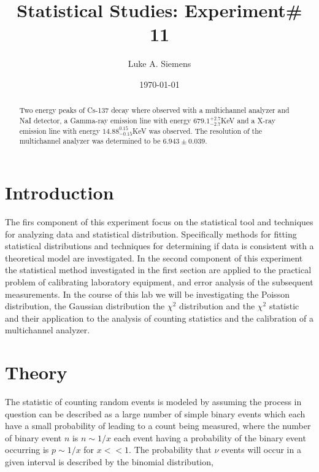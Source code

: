 \documentclass[%
 reprint,
 amsmath,amssymb,
 aps,
]{revtex4-1}
\begin{document}
\title{Statistical Studies: Experiment\# 11}%

\author{Luke A. Siemens}

\date{\today}

\begin{abstract}
Two energy peaks of Cs-137 decay where observed with a multichannel analyzer and NaI detector, a Gamma-ray emission line with energy $679.1_{-2.7}^{+2.7}$KeV and a X-ray emission line with energy $14.88_{-0.15}^{0.15}$KeV was observed. The resolution of the multichannel analyzer was determined to be $6.943\pm0.039$.
\end{abstract}

\maketitle

\section{Introduction}

The firs component of this experiment focus on the statistical tool and techniques for analyzing data and statistical distribution. Specifically methods for fitting statistical distributions and techniques for determining if data is consistent with a theoretical model are investigated. In the second component of this experiment the statistical method investigated in the first section are applied to the practical problem of calibrating laboratory equipment, and error analysis of the subsequent measurements. In the course of this lab we will be investigating the Poisson distribution, the Gaussian distribution the $\chi^2$ distribution and the $\chi^2$ statistic and their application to the analysis of counting statistics and the calibration of a multichannel analyzer.

\section{Theory}
The statistic of counting random events is modeled by assuming the process in question can be described as a large number of simple binary events which each have a small probability of leading to a count being measured, where the number of binary event $n$ is $n\sim1/x$ each event having a probability of the binary event occurring is $p\sim1/x$ for $x<<1$. The probability that $\nu$ events will occur in a given interval is described by the binomial distribution,
\end{document}
